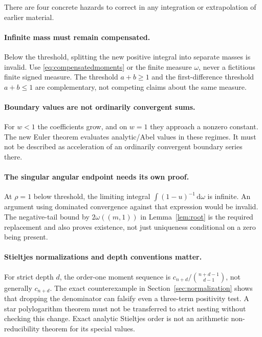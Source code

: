 \documentclass[11pt]{article}
\numberwithin{equation}{section}
\theoremstyle{definition}
\theoremstyle{remark}
\newcommand{\dd}{\,\mathrm d}
\begin{document}
There are four concrete hazards to correct in any integration or
extrapolation of earlier material.

\paragraph{Infinite mass must remain compensated.}
Below the threshold, splitting the new positive integral into separate
masses is invalid. Use \eqref{eq:compensatedmoments} or the finite measure
$\omega$, never a fictitious finite signed measure. The threshold
$a+b\ge1$ and the first-difference threshold $a+b\le1$ are complementary,
not competing claims about the same measure.

\paragraph{Boundary values are not ordinarily convergent sums.}
For $w<1$ the coefficients grow, and on $w=1$ they approach a nonzero
constant. The new Euler theorem evaluates analytic/Abel values in
these regimes. It must not be described as acceleration of an
ordinarily convergent boundary series there.

\paragraph{The singular angular endpoint needs its own proof.}
At $\rho=1$ below threshold, the limiting integral
$\int(1-u)^{-1}\dd\omega$ is infinite. An argument using dominated
convergence against that expression would be invalid. The negative-tail
bound by $2\omega((m,1))$ in Lemma~\ref{lem:root} is the required
replacement and also proves existence, not just uniqueness conditional
on a zero being present.

\paragraph{Stieltjes normalizations and depth conventions matter.}
For strict depth $d$, the order-one moment sequence is
$c_{n+d}/\binom{n+d-1}{d-1}$, not generally $c_{n+d}$. The exact
counterexample in Section~\ref{sec:normalization} shows that dropping
the denominator can falsify even a three-term positivity test. A star
polylogarithm theorem must not be transferred to strict nesting without
checking this change. Exact analytic Stieltjes order is not an
arithmetic non-reducibility theorem for its special values.
\end{document}
